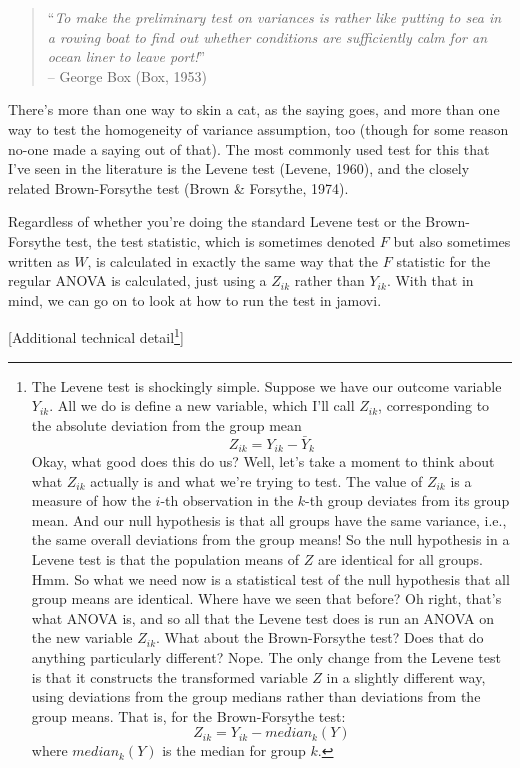 \documentclass[
  a4paper,
]{book}
\begin{document}
\begin{quote}
``\emph{To make the preliminary test on variances is rather like putting
to sea in a rowing boat to find out whether conditions are sufficiently
calm for an ocean liner to leave port!}''\\
-- George Box (Box, 1953)
\end{quote}

There's more than one way to skin a cat, as the saying goes, and more
than one way to test the homogeneity of variance assumption, too (though
for some reason no-one made a saying out of that). The most commonly
used test for this that I've seen in the literature is the Levene test
(Levene, 1960), and the closely related Brown-Forsythe test (Brown \&
Forsythe, 1974).

Regardless of whether you're doing the standard Levene test or the
Brown-Forsythe test, the test statistic, which is sometimes denoted
\(F\) but also sometimes written as \(W\), is calculated in exactly the
same way that the \(F\) statistic for the regular ANOVA is calculated,
just using a \(Z_{ik}\) rather than \(Y_{ik}\). With that in mind, we
can go on to look at how to run the test in jamovi.

{[}Additional technical detail\footnote{The Levene test is shockingly
  simple. Suppose we have our outcome variable \(Y_{ik}\). All we do is
  define a new variable, which I'll call \(Z_{ik}\), corresponding to
  the absolute deviation from the group mean
  \[Z_{ik}=Y_{ik}-\bar{Y}_{k}\] Okay, what good does this do us? Well,
  let's take a moment to think about what \(Z_{ik}\) actually is and
  what we're trying to test. The value of \(Z_{ik}\) is a measure of how
  the \(i\)-th observation in the \(k\)-th group deviates from its group
  mean. And our null hypothesis is that all groups have the same
  variance, i.e., the same overall deviations from the group means! So
  the null hypothesis in a Levene test is that the population means of
  \(Z\) are identical for all groups. Hmm. So what we need now is a
  statistical test of the null hypothesis that all group means are
  identical. Where have we seen that before? Oh right, that's what ANOVA
  is, and so all that the Levene test does is run an ANOVA on the new
  variable \(Z_{ik}\). What about the Brown-Forsythe test? Does that do
  anything particularly different? Nope. The only change from the Levene
  test is that it constructs the transformed variable \(Z\) in a
  slightly different way, using deviations from the group medians rather
  than deviations from the group means. That is, for the Brown-Forsythe
  test: \[Z_{ik}=Y_{ik}-median_k(Y)\] where \(median_k(Y)\) is the
  median for group \(k\).}{]}
\end{document}
